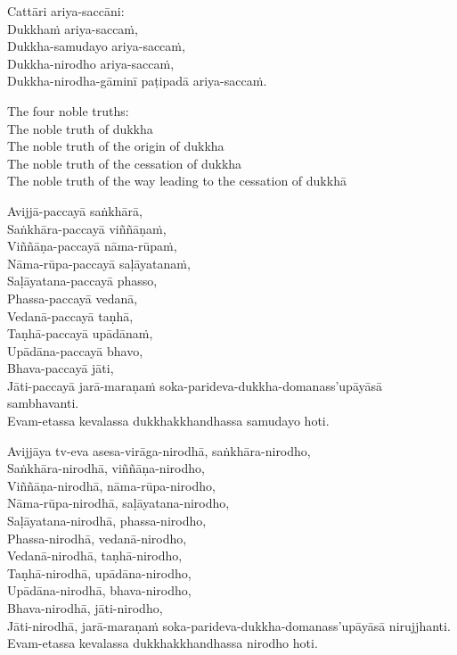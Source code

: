 \suttaRef{[Vibh]}

Cattāri ariya-saccāni:\\
Dukkhaṁ ariya-saccaṁ,\\
Dukkha-samudayo ariya-saccaṁ,\\
Dukkha-nirodho ariya-saccaṁ,\\
Dukkha-nirodha-gāminī paṭipadā ariya-saccaṁ.

\begin{english}
  The four noble truths:\\
  The noble truth of dukkha\\
  The noble truth of the origin of dukkha\\
  The noble truth of the cessation of dukkha\\
  The noble truth of the way leading to the cessation of dukkhā
\end{english}

\suttaRef{[SN 56.24]}

Avijjā-paccayā saṅkhārā,\\
Saṅkhāra-paccayā viññāṇaṁ,\\
Viññāṇa-paccayā nāma-rūpaṁ,\\
Nāma-rūpa-paccayā saḷāyatanaṁ,\\
Saḷāyatana-paccayā phasso,\\
Phassa-paccayā vedanā,\\
Vedanā-paccayā taṇhā,\\
Taṇhā-paccayā upādānaṁ,\\
Upādāna-paccayā bhavo,\\
Bhava-paccayā jāti,\\
Jāti-paccayā jarā-maraṇaṁ soka-parideva-dukkha-domanass’upāyāsā sambhavanti.\\
Evam-etassa kevalassa dukkhakkhandhassa samudayo hoti.

Avijjāya tv-eva asesa-virāga-nirodhā, saṅkhāra-nirodho,\\
Saṅkhāra-nirodhā, viññāṇa-nirodho,\\
Viññāṇa-nirodhā, nāma-rūpa-nirodho,\\
Nāma-rūpa-nirodhā, saḷāyatana-nirodho,\\
Saḷāyatana-nirodhā, phassa-nirodho,\\
Phassa-nirodhā, vedanā-nirodho,\\
Vedanā-nirodhā, taṇhā-nirodho,\\
Taṇhā-nirodhā, upādāna-nirodho,\\
Upādāna-nirodhā, bhava-nirodho,\\
Bhava-nirodhā, jāti-nirodho,\\
Jāti-nirodhā, jarā-maraṇaṁ soka-parideva-dukkha-domanass’upāyāsā nirujjhanti.\\
Evam-etassa kevalassa dukkhakkhandhassa nirodho hoti.

